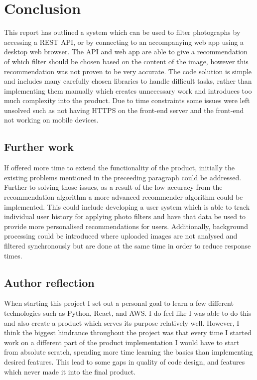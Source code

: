 \documentclass[a4paper,12pt]{report}
\begin{document}
\chapter{Conclusion}
  This report has outlined a system which can be used to filter photographs by accessing a REST API, or by connecting to an accompanying web app using a desktop web browser. The API and web app are able to give a recommendation of which filter should be chosen based on the content of the image, however this recommendation was not proven to be very accurate. The code solution is simple and includes many carefully chosen libraries to handle difficult tasks, rather than implementing them manually which creates unnecessary work and introduces too much complexity into the product. Due to time constraints some issues were left unsolved such as not having HTTPS on the front-end server and the front-end not working on mobile devices.

  \newpage
  \section{Further work}
    If offered more time to extend the functionality of the product, initially the existing problems mentioned in the preceeding paragraph could be addressed. Further to solving those issues, as a result of the low accuracy from the recommendation algorithm a more advanced recommender algorithm could be implemented. This could include developing a user system which is able to track individual user history for applying photo filters and have that data be used to provide more personalised recommendations for users. Additionally, background processing could be introduced where uploaded images are not analysed and filtered synchronously but are done at the same time in order to reduce response times.

  \section{Author reflection}
    When starting this project I set out a personal goal to learn a few different technologies such as Python, React, and AWS. I do feel like I was able to do this and also create a product which serves its purpose relatively well. However, I think the biggest hindrance throughout the project was that every time I started work on a different part of the product implementation I would have to start from absolute scratch, spending more time learning the basics than implementing desired features. This lead to some gaps in quality of code design, and features which never made it into the final product.
\end{document}
